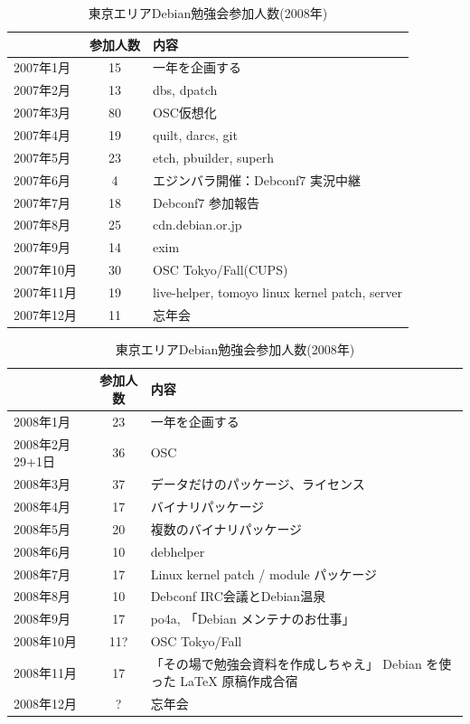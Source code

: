 \documentclass[mingoth,a4paper]{jsarticle}
\begin{document}
\begin{commandline}
\begin{table}[t]
\begin{minipage}{0.5\hsize}
 \caption{東京エリアDebian勉強会参加人数(2007年)}\label{tab:count2007-1}
 \begin{center}
  \begin{tabular}{|l|c|p{10em}|}
 \hline
 & 参加人数 & 内容\\
 \hline
2007年1月 & 15 & 一年を企画する \\
2007年2月 & 13 & dbs, dpatch\\ 
2007年3月 & 80 & OSC仮想化 \\
2007年4月 & 19 & quilt, darcs, git\\
2007年5月 & 23 & etch, pbuilder, superh \\   
2007年6月 & 4 & エジンバラ開催：Debconf7 実況中継 \\
2007年7月 & 18 & Debconf7 参加報告\\
2007年8月 & 25 & cdn.debian.or.jp \\   
2007年9月 & 14 & exim \\   
2007年10月 & 30 & OSC Tokyo/Fall(CUPS) \\   
2007年11月 & 19 & live-helper, tomoyo linux kernel patch, server\\
2007年12月 & 11 & 忘年会\\
 \hline
  \end{tabular}
 \end{center}
\end{minipage}
\begin{minipage}{0.5\hsize}
 \caption{東京エリアDebian勉強会参加人数(2008年)}\label{tab:count2008-1}
 \begin{center}
  \begin{tabular}{|l|c|p{10em}|}
 \hline
 & 参加人数 & 内容\\
 \hline
2008年1月 & 23 & 一年を企画する \\
2008年2月29+1日 & 36 & OSC  \\
2008年3月 & 37 & データだけのパッケージ、ライセンス \\
2008年4月 & 17 & バイナリパッケージ \\
2008年5月 & 20 & 複数のバイナリパッケージ \\
2008年6月 & 10 & debhelper \\
2008年7月 & 17 & Linux kernel patch / module パッケージ \\
2008年8月 & 10 & Debconf IRC会議とDebian温泉 \\
2008年9月 & 17 & po4a, 「Debian メンテナのお仕事」 \\
2008年10月 & 11? & OSC Tokyo/Fall \\
2008年11月 & 17 & 「その場で勉強会資料を作成しちゃえ」 Debian を使った \LaTeX{} 原稿作成合宿 \\
2008年12月 & ? & 忘年会 \\
 \hline
  \end{tabular}
 \end{center}
\end{minipage}
\end{table}


\end{commandline}
\end{document}
